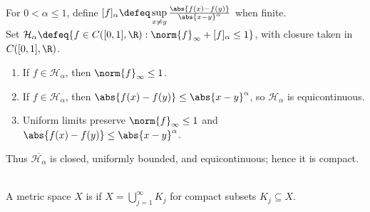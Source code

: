 \begin{example} \label{ex:holder-unit-ball-precompact-arzela-ascoli} \\
For $0<\alpha\leq1$, define $[f]_{\alpha}\defeq\sup\limits_{x\ne y}\frac{\abs{f(x)-f(y)}}{\abs{x-y}^{\alpha}}$ when finite.\\
Set $\mathcal{H}_{\alpha}\defeq\{f\in C([0,1],\R):\norm{f}_{\infty}+[f]_{\alpha}\leq1\}$, with closure taken in $C([0,1],\R)$.
\begin{enumerate}[label=(\roman*)]
\setlength{\itemsep}{0pt}
\item If $f\in\mathcal{H}_{\alpha}$, then $\norm{f}_{\infty}\leq1$.
\item If $f\in\mathcal{H}_{\alpha}$, then $\abs{f(x)-f(y)}\leq\abs{x-y}^{\alpha}$, so $\mathcal{H}_{\alpha}$ is equicontinuous.
\item Uniform limits preserve $\norm{f}_{\infty}\leq1$ and $\abs{f(x)-f(y)}\leq\abs{x-y}^{\alpha}$.
\end{enumerate}
Thus $\overline{\mathcal{H}_{\alpha}}$ is closed, uniformly bounded, and equicontinuous; hence it is compact.
\end{example}

\begin{definition} \label{def:sigma-compact-metric-space} \\
A metric space $X$ is  if $X=\bigcup\limits_{j=1}^{\infty}K_j$ for compact subsets $K_j\subseteq X$.
\end{definition}

